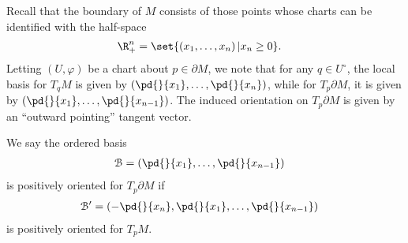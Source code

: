 \documentclass[10pt]{mypackage}
\begin{document}
Recall that the boundary of $M$ consists of those points whose charts can be identified with the half-space
\begin{align*}
  \R^{n}_{+} &= \set{\left( x_1,\dots,x_n \right) | x_n\geq 0}.
\end{align*}
Letting $\left( U,\varphi \right)$ be a chart about $p\in \partial M$, we note that for any $q\in U^{\circ}$, the local basis for $T_qM$ is given by $ \left( \pd{}{x_1},\dots, \pd{}{x_n} \right) $, while for $T_p \partial M$, it is given by $ \left( \pd{}{x_1},\dots,\pd{}{x_{n-1}} \right) $. The induced orientation on $T_p\partial M$ is given by an ``outward pointing'' tangent vector.
\begin{definition}
  We say the ordered basis
  \begin{align*}
    \mathcal{B} &= \left( \pd{}{x_1},\dots, \pd{}{x_{n-1}} \right)
  \end{align*}
  is positively oriented for $T_p\partial M$ if
  \begin{align*}
    \mathcal{B}' &= \left( -\pd{}{x_n},\pd{}{x_1},\dots,\pd{}{x_{n-1}} \right)
  \end{align*}
  is positively oriented for $T_pM$.
\end{definition}
\end{document}
